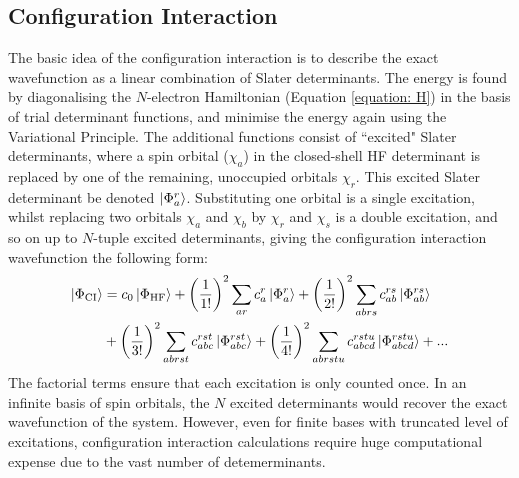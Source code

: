 \subsection{Configuration Interaction}\label{section: CI}
The basic idea of the configuration interaction is to describe the exact wavefunction as a linear combination of Slater determinants. The energy is found by diagonalising the $N$-electron Hamiltonian (Equation \ref{equation: H}) in the basis of trial determinant functions, and minimise the energy again using the Variational Principle.\cite{szabo1996} The additional functions consist of ``excited" Slater determinants, where a spin orbital ($\chi_{a}$) in the closed-shell \ac{HF} determinant is replaced by one of the remaining, unoccupied orbitals $\chi_{r}$. This excited Slater determinant be denoted $\ket{\Phi_{a}^{r}}$.  Substituting one orbital is a single excitation, whilst replacing two orbitals $\chi_{a}$ and $\chi_{b}$ by $\chi_{r}$ and $\chi_{s}$ is a double excitation, and so on up to $N$-tuple excited determinants, giving the configuration interaction wavefunction the following form:\cite{szabo1996}
\begin{align}\label{equation: config_int}
\begin{split}
\ket{\Phi_{\mathrm{CI}}}&=c_{0}\ket{\Phi_{\mathrm{HF}}}+\bigg(\frac{1}{1!}\bigg)^{2}\sum_{ar}c_{a}^{r}\ket{\Phi_{a}^{r}}+\bigg(\frac{1}{2!}\bigg)^{2}\sum_{abrs}c_{ab}^{rs}\ket{\Phi_{ab}^{rs}}\\&+\bigg(\frac{1}{3!}\bigg)^{2}\sum_{abrst}c_{abc}^{rst}\ket{\Phi_{abc}^{rst}}
+\bigg(\frac{1}{4!}\bigg)^{2}\sum_{abrstu}c_{abcd}^{rstu}\ket{\Phi_{abcd}^{rstu}}+...
\end{split}
\end{align}
The factorial terms ensure that each excitation is only counted once. In an infinite basis of spin orbitals, the $N$ excited determinants would recover the exact wavefunction of the system. However, even for finite bases with truncated level of excitations, configuration interaction calculations require huge computational expense due to the vast number of detemerminants.
